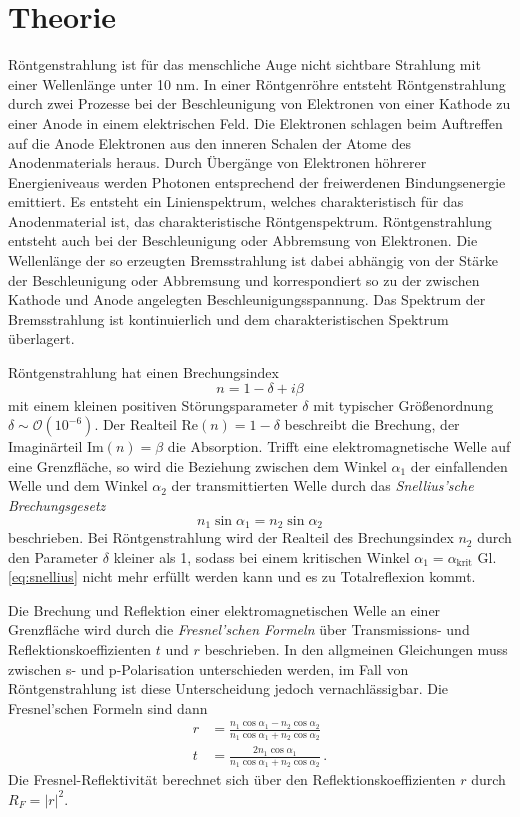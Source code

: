 \section{Theorie}
Röntgenstrahlung ist für das menschliche Auge nicht sichtbare Strahlung mit einer Wellenlänge unter 10 nm.
In einer Röntgenröhre entsteht Röntgenstrahlung durch zwei Prozesse bei der Beschleunigung von 
Elektronen von einer Kathode zu einer Anode in einem elektrischen Feld. Die Elektronen schlagen
beim Auftreffen auf die Anode Elektronen aus den inneren Schalen der Atome des Anodenmaterials heraus. 
Durch Übergänge von Elektronen höhrerer Energieniveaus werden Photonen entsprechend der 
freiwerdenen Bindungsenergie emittiert. Es entsteht ein Linienspektrum, welches charakteristisch für das 
Anodenmaterial ist, das charakteristische Röntgenspektrum. 
Röntgenstrahlung entsteht auch bei der Beschleunigung oder Abbremsung von Elektronen. Die 
Wellenlänge der so erzeugten Bremsstrahlung ist dabei abhängig von der Stärke der Beschleunigung oder 
Abbremsung und korrespondiert so zu der zwischen Kathode und Anode angelegten Beschleunigungsspannung.
Das Spektrum der Bremsstrahlung ist kontinuierlich und dem charakteristischen Spektrum überlagert.

Röntgenstrahlung hat einen Brechungsindex
\begin{equation*}
    n = 1 - \delta + i \beta
\end{equation*}
mit einem kleinen positiven Störungsparameter $\delta$ mit typischer Größenordnung 
$\delta \sim \mathcal{O}(10^{-6})$. Der Realteil $\text{Re}(n) = 1-\delta$ beschreibt die Brechung, der
Imaginärteil $\text{Im}(n) = \beta$ die Absorption.
Trifft eine elektromagnetische Welle auf eine Grenzfläche, so wird die Beziehung zwischen dem Winkel 
$\alpha_1$ der einfallenden Welle und dem Winkel $\alpha_2$ der transmittierten Welle durch das 
\textit{Snellius'sche Brechungsgesetz}
\begin{equation}
    n_1 \sin \alpha_1 = n_2 \sin \alpha_2 
    \label{eq:snellius}
\end{equation}
beschrieben. Bei Röntgenstrahlung wird der Realteil des Brechungsindex $n_2$ durch den Parameter $\delta$ 
kleiner als 1, sodass bei einem kritischen Winkel $\alpha_1 = \alpha_\text{krit}$ Gl. \ref{eq:snellius} nicht
mehr erfüllt werden kann und es zu Totalreflexion kommt.

Die Brechung und Reflektion einer elektromagnetischen Welle an einer Grenzfläche wird durch die 
\textit{Fresnel'schen Formeln} über Transmissions- und Reflektionskoeffizienten $t$ und $r$ beschrieben. 
In den allgmeinen Gleichungen muss zwischen s- und p-Polarisation unterschieden werden, im Fall von 
Röntgenstrahlung ist diese Unterscheidung jedoch vernachlässigbar. Die Fresnel'schen Formeln sind dann 
\begin{align*}
    r &= \frac{n_1 \cos \alpha_1 - n_2 \cos \alpha_2}{n_1 \cos \alpha_1 + n_2 \cos \alpha_2} \\
    t &= \frac{2 n_1 \cos \alpha_1}{n_1 \cos \alpha_1 + n_2 \cos \alpha_2} \, .
\end{align*}
Die Fresnel-Reflektivität berechnet sich über den Reflektionskoeffizienten $r$ durch $R_F = |r|^2$. 

